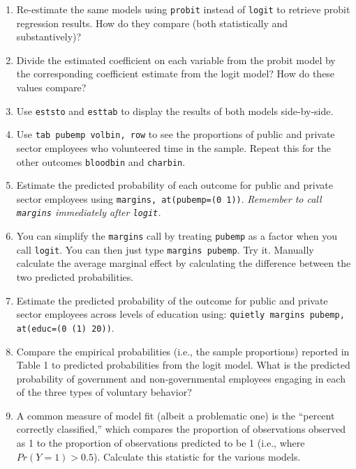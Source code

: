 \documentclass[a4paper,12pt]{article}
\begin{document}
\begin{enumerate}
\item Re-estimate the same models using \texttt{probit} instead of \texttt{logit} to retrieve probit regression results. How do they compare (both statistically and substantively)?

\item Divide the estimated coefficient on each variable from the probit model by the corresponding coefficient estimate from the logit model? How do these values compare?

\item Use \texttt{eststo} and \texttt{esttab} to display the results of both models side-by-side.

\item Use \texttt{tab pubemp volbin, row} to see the proportions of public and private sector employees who volunteered time in the sample. Repeat this for the other outcomes \texttt{bloodbin} and \texttt{charbin}.

\item Estimate the predicted probability of each outcome for public and private sector employees using \texttt{margins, at(pubemp=(0 1))}. {\em Remember to call \texttt{margins} immediately after \texttt{logit}.}

\item You can simplify the \texttt{margins} call by treating \texttt{pubemp} as a factor when you call \texttt{logit}. You can then just type \texttt{margins pubemp}. Try it. Manually calculate the average marginal effect by calculating the difference between the two predicted probabilities.

\item Estimate the predicted probability of the outcome for public and private sector employees across levels of education using: \texttt{quietly margins pubemp, at(educ=(0 (1) 20))}.

\item Compare the empirical probabilities (i.e., the sample proportions) reported in Table 1 to predicted probabilities from the logit model. What is the predicted probability of government and non-governmental employees engaging in each of the three types of voluntary behavior?

\item A common measure of model fit (albeit a problematic one) is the ``percent correctly classified,'' which compares the proportion of observations observed as 1 to the proportion of observations predicted to be 1 (i.e., where $Pr(Y=1) > 0.5$). Calculate this statistic for the various models.


\end{enumerate}
\end{document}
